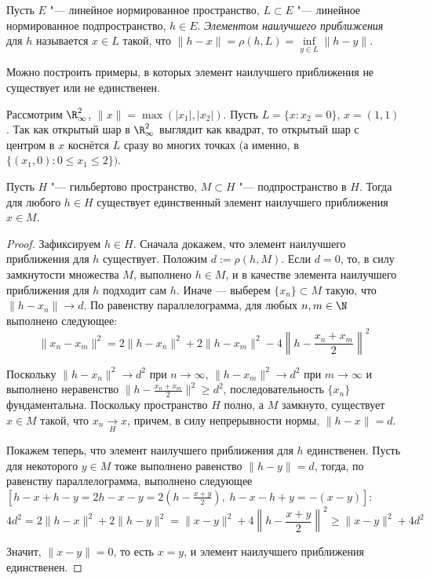 \begin{definition}
	Пусть $E$ "--- линейное нормированное пространство, $L \subset E$ "--- линейное нормированное подпространство, $h \in E$. \textit{Элементом наилучшего приближения} для $h$ называется $x \in L$ такой, что 
    $\|h - x\| = \rho(h, L) = \inf \limits_{y \in L} \|h - y\|$.
\end{definition}

\begin{note}
	Можно построить примеры, в которых элемент наилучшего приближения не существует или не единственен.
\end{note}

\begin{example}
Рассмотрим $\R^2_{\infty}$, $\|x\| = \max(|x_1|, |x_2|)$.
Пусть $L = \{x : x_2 = 0\}$, $x = (1, 1)$. Так как открытый шар 
в $\R^2_{\infty}$ выглядит как квадрат, то открытый шар
с центром в $x$ коснётся $L$ сразу во многих точках
(а именно, в $\{ (x_1, 0) : 0 \leqslant x_1 \leqslant 2 \})$.
\end{example}

\begin{proposition}\label{bestelt}
	Пусть $H$ "--- гильбертово пространство, $M \subset H$ "--- подпространство в $H$. Тогда для любого $h \in H$ существует единственный элемент наилучшего приближения $x \in M$.
\end{proposition}

\begin{proof}
	Зафиксируем $h \in H$. Сначала докажем, что элемент наилучшего приближения для $h$ существует. Положим $d := \rho(h, M)$. Если $d = 0$, то, в силу замкнутости множества $M$, выполнено $h \in M$, и в качестве элемента наилучшего приближения для $h$ подходит сам $h$. Иначе --- выберем $\{x_n\} \subset M$ такую, что $\|h - x_n\| \to d$. По равенству параллелограмма, для любых $n, m \in \N$ выполнено следующее:
	\[\|x_n - x_m\|^2 = 2\|h - x_n\|^2 + 2\|h - x_m\|^2 - 4\left\|h - \frac{x_n + x_m}{2}\right\|^2\]

	Поскольку $\|h - x_n\|^2 \to d^2$ при $n \to \infty$, $\|h - x_m\|^2 \to d^2$ при $m \to \infty$ и выполнено неравенство $\|h - \frac{x_n + x_m}{2}\|^2 \ge d^2$, последовательность $\{x_n\}$ фундаментальна. Поскольку пространство $H$ полно, а $M$ замкнуто, существует $x \in M$ такой, что $x_n \xrightarrow[H]{} x$, причем, в силу непрерывности нормы, $\|h - x\| = d$.

	Покажем теперь, что элемент наилучшего приближения для $h$ единственен. Пусть для некоторого $y \in M$ тоже выполнено равенство $\|h - y\| = d$, тогда, по равенству параллелограмма, выполнено следующее $\left[h - x + h - y = 2h - x -y = 2(h - \frac{x+y}{2}), \; h - x - h + y = -(x - y)\right]$:
	\[4d^2 = 2\|h - x\|^2 + 2\|h - y\|^2 = \|x - y\|^2 + 4\left\|h - \frac{x+y}{2}\right\|^2 \geqslant \|x - y\|^2 + 4d^2\]

	Значит, $\|x - y\| = 0$, то есть $x = y$, и элемент наилучшего приближения единственен.
\end{proof}


